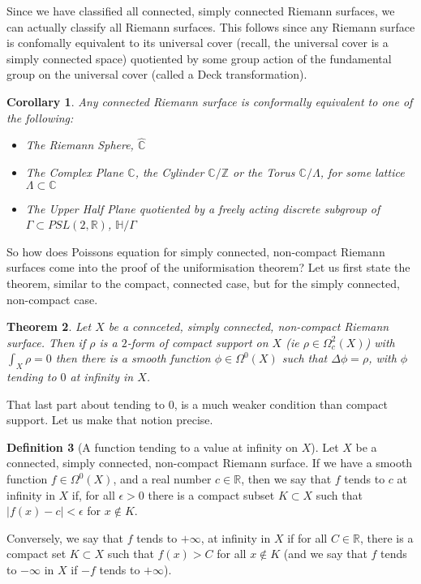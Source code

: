 \documentclass[11pt]{report}
\newtheorem{thm}{Theorem}[section]
\newtheorem{cor}[thm]{Corollary}
\theoremstyle{definition}
\newtheorem{defn}[thm]{Definition}
\begin{document}
Since we have classified all connected, simply connected Riemann surfaces, we can actually classify all Riemann surfaces. This follows since any Riemann surface is confomally equivalent to its universal cover (recall, the universal cover is a simply connected space) quotiented by some group action of the fundamental group on the universal cover (called a Deck transformation).
\begin{cor}
  Any connected Riemann surface is conformally equivalent to one of the following:
  \begin{itemize}
    \item The Riemann Sphere, $\hat{\mathbb{C}}$
    \item The Complex Plane $\mathbb{C}$, the Cylinder $\mathbb{C}/\mathbb{Z}$ or the Torus $\mathbb{C}/\Lambda$, for some lattice $\Lambda \subset \mathbb{C}$
    \item The Upper Half Plane quotiented by a freely acting discrete subgroup of $\Gamma \subset PSL(2,\mathbb{R})$, $\mathbb{H}/\Gamma$ 
  \end{itemize}
\end{cor}
So how does Poissons equation for simply connected, non-compact Riemann surfaces come into the proof of the uniformisation theorem? Let us first state the theorem, similar to the compact, connected case, but for the simply connected, non-compact case.
\begin{thm}\label{NonCompactPoissons}
  Let $X$ be a connceted, simply connected, non-compact Riemann surface. Then if $\rho$ is a $2$-form of compact support on $X$ (ie $\rho \in \Omega^2_c(X)$) with $\int_X \rho = 0$ then there is a smooth function $\phi \in \Omega^0(X)$ such that $\Delta \phi = \rho$, with $\phi$ tending to $0$ at infinity in $X$.
\end{thm}
That last part about tending to $0$, is a much weaker condition than compact support. Let us make that notion precise.
\begin{defn}[A function tending to a value at infinity on $X$]
  Let $X$ be a connected, simply connected, non-compact Riemann surface. If we have a smooth function $f \in \Omega^0(X)$, and a real number $c \in \mathbb{R}$, then we say that $f$ tends to $c$ at infinity in $X$ if, for all $\epsilon > 0$ there is a compact subset $K \subset X$ such that $|f(x) - c| < \epsilon$ for $x \notin K$.

  Conversely, we say that $f$ tends to $+\infty$, at infinity in $X$ if for all $C \in \mathbb{R}$, there is a compact set $K \subset X$ such that $f(x) > C$ for all $x \notin K$ (and we say that $f$ tends to $-\infty$ in $X$ if $-f$ tends to $+\infty$).
\end{defn}
\end{document}
